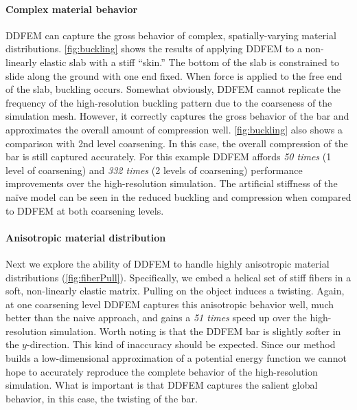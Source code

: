 \paragraph{Complex material behavior} DDFEM can capture the gross behavior of  complex, spatially-varying material distributions. \autoref{fig:buckling} shows the results of applying DDFEM to a non-linearly elastic slab with a stiff ``skin.'' The bottom of the slab is constrained to slide along the ground with one end fixed. When force is applied to the free end of the slab, buckling occurs.  Somewhat obviously, DDFEM cannot replicate the frequency of the high-resolution buckling pattern due to the coarseness of the simulation mesh. However, it correctly captures the gross behavior of the bar and approximates the overall amount of compression well. \autoref{fig:buckling} also shows a comparison with 2nd level coarsening. In this case, the overall compression of the bar is still captured accurately. For this example DDFEM affords \emph{50 times} (1 level of coarsening) and \emph{332 times}  (2 levels of coarsening) performance improvements over the high-resolution simulation.  The artificial stiffness of the na\"{i}ve model can be seen in the reduced buckling and compression when compared to DDFEM at both coarsening levels.
\paragraph{Anisotropic material distribution} Next we explore the ability of DDFEM to handle highly anisotropic material distributions (\autoref{fig:fiberPull}). Specifically, we embed a helical set of stiff fibers in a soft, non-linearly elastic matrix. Pulling on the object induces a twisting. Again, at one coarsening level DDFEM captures this anisotropic behavior well, much better than the naive approach, and gains a \emph{51 times} speed up over the high-resolution simulation. Worth noting is that the DDFEM bar is slightly softer in the $y$-direction. This kind of inaccuracy should be expected. Since our method builds a low-dimensional approximation of a potential energy function we cannot hope to accurately reproduce the complete behavior of the high-resolution simulation.  What is important is that DDFEM captures the salient global behavior, in this case, the twisting of the bar. 
